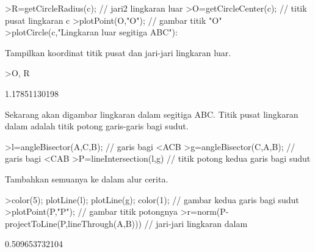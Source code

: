 \documentclass[a4paper,10pt]{article}
\begin{document}
\begin{eulernotebook}
\begin{eulercomment}
\begin{eulercomment}
\begin{eulercomment}
\begin{eulercomment}
\begin{eulercomment}
\begin{eulercomment}
\begin{eulercomment}
\begin{eulercomment}
\begin{eulercomment}
\begin{eulercomment}
\begin{eulercomment}
\begin{eulercomment}
\begin{eulercomment}
\begin{eulercomment}
\begin{eulercomment}
\begin{eulercomment}
\begin{eulercomment}
\begin{eulercomment}
\begin{eulercomment}
\begin{eulercomment}
\begin{eulercomment}
\begin{eulercomment}
\begin{eulercomment}
\begin{eulercomment}
\begin{eulercomment}
\begin{eulercomment}
\begin{eulercomment}
\begin{eulercomment}
\begin{eulercomment}
\begin{eulercomment}
\begin{eulerprompt}
>R=getCircleRadius(c); // jari2 lingkaran luar 
>O=getCircleCenter(c); // titik pusat lingkaran c 
>plotPoint(O,"O"); // gambar titik "O"
>plotCircle(c,"Lingkaran luar segitiga ABC"):
\end{eulerprompt}
\begin{eulercomment}
Tampilkan koordinat titik pusat dan jari-jari lingkaran luar.
\end{eulercomment}
\begin{eulerprompt}
>O, R
\end{eulerprompt}
\begin{euleroutput}
  [1.16666666667,  1.16666666667]
  1.17851130198
\end{euleroutput}
\begin{eulercomment}
Sekarang akan digambar lingkaran dalam segitiga ABC. Titik pusat lingkaran dalam adalah
titik potong garis-garis bagi sudut.
\end{eulercomment}
\begin{eulerprompt}
>l=angleBisector(A,C,B); // garis bagi <ACB
>g=angleBisector(C,A,B); // garis bagi <CAB
>P=lineIntersection(l,g) // titik potong kedua garis bagi sudut
\end{eulerprompt}
\begin{euleroutput}
  [0.86038,  0.86038]
\end{euleroutput}
\begin{eulercomment}
Tambahkan semuanya ke dalam alur cerita.
\end{eulercomment}
\begin{eulerprompt}
>color(5); plotLine(l); plotLine(g); color(1); // gambar kedua garis bagi sudut
>plotPoint(P,"P"); // gambar titik potongnya
>r=norm(P-projectToLine(P,lineThrough(A,B))) // jari-jari lingkaran dalam
\end{eulerprompt}
\begin{euleroutput}
  0.509653732104
\end{euleroutput}
\begin{eulerprompt}

\end{eulerprompt}
\end{eulercomment}
\end{eulercomment}
\end{eulercomment}
\end{eulercomment}
\end{eulercomment}
\end{eulercomment}
\end{eulercomment}
\end{eulercomment}
\end{eulercomment}
\end{eulercomment}
\end{eulercomment}
\end{eulercomment}
\end{eulercomment}
\end{eulercomment}
\end{eulercomment}
\end{eulercomment}
\end{eulercomment}
\end{eulercomment}
\end{eulercomment}
\end{eulercomment}
\end{eulercomment}
\end{eulercomment}
\end{eulercomment}
\end{eulercomment}
\end{eulercomment}
\end{eulercomment}
\end{eulercomment}
\end{eulercomment}
\end{eulercomment}
\end{eulercomment}
\end{eulernotebook}
\end{document}
